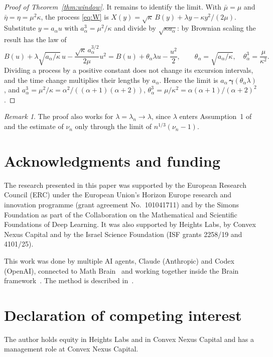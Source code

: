 \documentclass[11pt]{amsart}
\theoremstyle{remark}
\newtheorem{remark}[theorem]{Remark}
\numberwithin{equation}{section}
\begin{document}
\begin{proof}[Proof of Theorem~\ref{thm:window}]
It remains to identify the limit. With $\bar\mu=\mu$ and $\bar\eta=\eta=\mu^2\kappa$, the process \eqref{eq:W} is $X(y)=\sqrt\kappa\,B(y)+\lambda y-\kappa y^2/(2\mu)$. Substitute $y=a_\alpha u$ with $a_\alpha^3=\mu^2/\kappa$ and divide by $\sqrt{\kappa a_\alpha}$: by Brownian scaling the result has the law of
\[
B(u)+\lambda\sqrt{a_\alpha/\kappa}\,u-\frac{\sqrt\kappa\,a_\alpha^{3/2}}{2\mu}u^2=B(u)+\theta_\alpha\lambda u-\frac{u^2}{2},\qquad \theta_\alpha=\sqrt{a_\alpha/\kappa},\quad \theta_\alpha^3=\frac{\mu}{\kappa^2}.
\]
Dividing a process by a positive constant does not change its excursion intervals, and the time change multiplies their lengths by $a_\alpha$. Hence the limit is $a_\alpha\,\boldsymbol\gamma(\theta_\alpha\lambda)$, and $a_\alpha^3=\mu^2/\kappa=\alpha^2/((\alpha+1)(\alpha+2))$, $\theta_\alpha^3=\mu/\kappa^2=\alpha(\alpha+1)/(\alpha+2)^2$.
\end{proof}

\begin{remark}
The proof also works for $\lambda=\lambda_n\to\lambda$, since $\lambda$ enters Assumption~1 of \cite{DHLS17} and the estimate of $\nu_n$ only through the limit of $n^{1/3}(\nu_n-1)$.
\end{remark}

\section*{Acknowledgments and funding}

The research presented in this paper was supported by the European Research Council (ERC) under the European Union's Horizon Europe research and innovation programme (grant agreement No.~101041711) and by the Simons Foundation as part of the Collaboration on the Mathematical and Scientific Foundations of Deep Learning. It was also supported by Heights Labs, by Convex Nexus Capital and by the Israel Science Foundation (ISF grants 2258/19 and 4101/25).

This work was done by multiple AI agents, Claude (Anthropic) and Codex (OpenAI), connected to Math Brain~\cite{MathBrainRepo} and working together inside the Brain framework~\cite{BrainFramework}. The method is described in~\cite{MathBrainPaper}.

\section*{Declaration of competing interest}

The author holds equity in Heights Labs and in Convex Nexus Capital and has a management role at Convex Nexus Capital.
\end{document}

